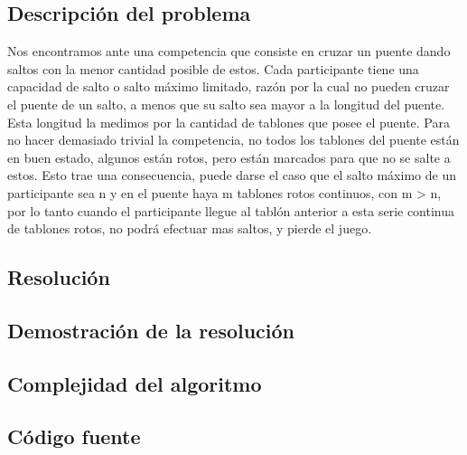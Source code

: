 \subsection{Descripci\'on del problema}

Nos encontramos ante una competencia que consiste en cruzar un puente dando saltos con la menor cantidad posible de estos.
Cada participante tiene una capacidad de salto o salto máximo limitado, razón por la cual no pueden cruzar el puente de un salto, a menos que su salto sea mayor a la longitud del puente. Esta longitud la medimos por la cantidad de tablones que posee el puente.
Para no hacer demasiado trivial la competencia, no todos los tablones del puente están en buen estado, algunos están rotos, pero están marcados para que no se salte a estos. Esto trae una consecuencia, puede darse el caso que el salto máximo de un participante sea n y en el puente haya m tablones rotos continuos, con m > n, por lo tanto cuando el participante llegue al tablón anterior a esta serie continua de tablones rotos, no podrá efectuar mas saltos, y pierde el juego. 

\subsection{Resoluci\'on}


\subsection{Demostraci\'on de la resoluci\'on}

\subsection{Complejidad del algoritmo}


\subsection{C\'odigo fuente}

